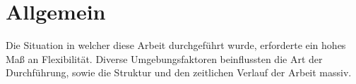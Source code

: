 \section{Allgemein}

Die Situation in welcher diese Arbeit durchgeführt wurde, erforderte ein hohes Maß an Flexibilität.
Diverse Umgebungsfaktoren beinflussten die Art der Durchführung, sowie die Struktur und den zeitlichen Verlauf der Arbeit massiv.